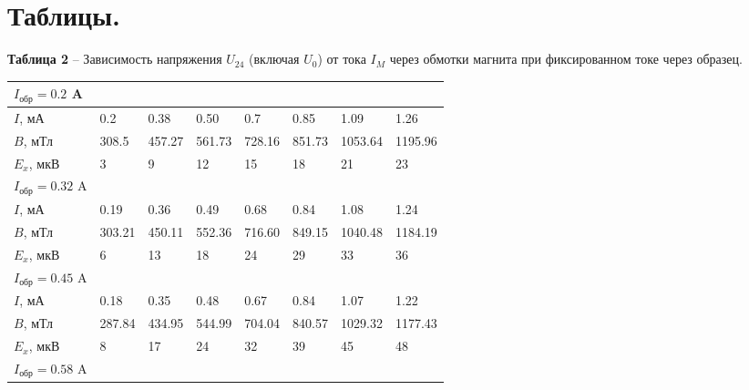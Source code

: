 \documentclass[12pt,a4paper]{article}
\begin{document}
\newpage
\section{Таблицы.}

    \begin{table}[!h]
    \begin{flushleft}%
   		\textbf{Таблица 2} -- Зависимость напряжения $U_{24}$ (включая $U_0$) от тока $I_M$ через обмотки магнита при фиксированном токе через образец.\\
    \end{flushleft}
        \begin{center}
            \begin{tabular}{ | l | l | l | l | l | l | l | l |}
                \hline
                $I_\text{обр} = 0.2$ A   &&&&&&& \\
                \hline
                $I$, мА     &   0.2     & 0.38  & 0.50  & 0.7   & 0.85  & 1.09      & 1.26      \\
                $B$, мТл    &   308.5   & 457.27& 561.73& 728.16& 851.73& 1053.64   & 1195.96   \\
                $E_x$, мкВ  &   3       & 9     & 12    & 15    & 18    & 21        & 23        \\
                \hline        
                $I_\text{обр} = 0.32$ A  &&&&&&& \\
                \hline
                $I$, мА     &   0.19    &   0.36& 0.49  & 0.68  & 0.84  & 1.08      & 1.24      \\
                $B$, мТл    &   303.21  & 450.11& 552.36& 716.60& 849.15& 1040.48   & 1184.19   \\
                $E_x$, мкВ  &   6       & 13    & 18    & 24    & 29    & 33        & 36        \\
                \hline     
                $I_\text{обр} = 0.45$ A  &&&&&&& \\
                \hline
                $I$, мА     &   0.18    & 0.35  & 0.48  & 0.67  & 0.84  & 1.07      & 1.22      \\
                $B$, мТл    &   287.84  & 434.95& 544.99& 704.04& 840.57& 1029.32   & 1177.43   \\
                $E_x$, мкВ  &   8       & 17    & 24    & 32    & 39    & 45        & 48        \\
                \hline   
                $I_\text{обр} = 0.58$ A  &&&&&&& \\

\end{tabular}
\end{center}
\end{table}
\end{document}
